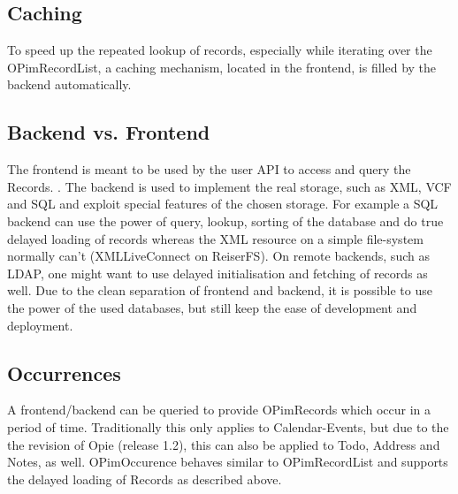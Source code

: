 \subsection{Caching}
To speed up the repeated lookup of records, especially while iterating
over the OPimRecordList, a caching mechanism, located in the frontend, is filled
by the backend automatically.

\subsection{Backend vs. Frontend}
The frontend is meant to be used by the user API to access
and query the Records. .
The backend is used to implement the real storage, such as XML, VCF
and SQL and exploit  special features of the chosen storage. For example
a SQL  backend can use the power of query, lookup, sorting of the database
and do true delayed loading of records whereas the XML resource on
a simple file-system normally can't (XMLLiveConnect on ReiserFS). 
On remote backends, such as LDAP, one might want to use delayed initialisation and
fetching of records as well. Due to the clean separation of frontend and backend,
it is possible to use the power of the used databases, but still keep the ease of development 
and deployment.

\subsection{Occurrences}
A frontend/backend can be queried to provide OPimRecords which occur in a 
period of time. Traditionally this only applies to Calendar-Events, but 
due to the the revision of Opie (release 1.2), this can also be applied to
Todo, Address and Notes, as well.
OPimOccurence behaves similar to OPimRecordList and supports the delayed
loading of Records as described above.
 
